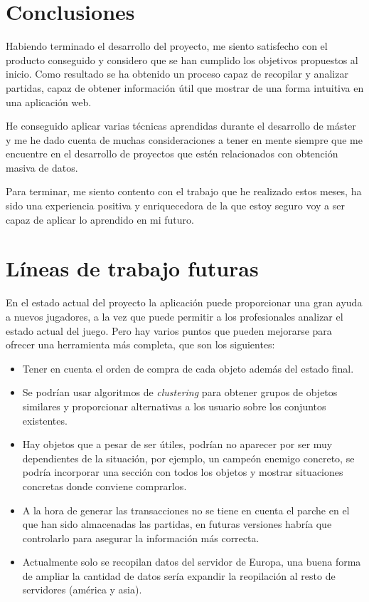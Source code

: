 
\section{Conclusiones}
Habiendo terminado el desarrollo del proyecto, me siento satisfecho con el producto conseguido y considero que se han cumplido los objetivos propuestos al inicio. Como resultado se ha obtenido un proceso capaz de recopilar y analizar partidas, capaz de obtener información útil que mostrar de una forma intuitiva en una aplicación web.

He conseguido aplicar varias técnicas aprendidas durante el desarrollo de máster y me he dado cuenta de muchas consideraciones a tener en mente siempre que me encuentre en el desarrollo de proyectos que estén relacionados con obtención masiva de datos.

Para terminar, me siento contento con el trabajo que he realizado estos meses, ha sido una experiencia positiva y enriquecedora de la que estoy seguro voy a ser capaz de aplicar lo aprendido en mi futuro.

\section{Líneas de trabajo futuras}
En el estado actual del proyecto la aplicación puede proporcionar una gran ayuda a nuevos jugadores, a la vez que puede permitir a los profesionales analizar el estado actual del juego. Pero hay varios puntos que pueden mejorarse para ofrecer una herramienta más completa, que son los siguientes:
\begin{itemize}
	\item Tener en cuenta el orden de compra de cada objeto además del estado final.
	\item Se podrían usar algoritmos de \textit{clustering} para obtener grupos de objetos similares y proporcionar alternativas a los usuario sobre los conjuntos existentes.
	\item Hay objetos que a pesar de ser útiles, podrían no aparecer por ser muy dependientes de la situación, por ejemplo, un campeón enemigo concreto, se podría incorporar una sección con todos los objetos y mostrar situaciones concretas donde conviene comprarlos.
	\item A la hora de generar las transacciones no se tiene en cuenta el parche en el que han sido almacenadas las partidas, en futuras versiones habría que controlarlo para asegurar la información más correcta.
	\item Actualmente solo se recopilan datos del servidor de Europa, una buena forma de ampliar la cantidad de datos sería expandir la reopilación al resto de servidores (américa y asia).
\end{itemize}